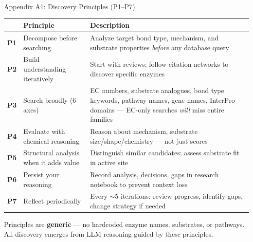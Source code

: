 \documentclass[aspectratio=169, 11pt]{beamer}
\begin{document}
\begin{frame}{Appendix A1: Discovery Principles (P1--P7)}
\vspace{-6pt}
{\scriptsize
\begin{tabular}{@{}c l p{9.5cm}@{}}
\toprule
 & \textbf{Principle} & \textbf{Description} \\
\midrule
\textbf{P1} & Decompose before searching & Analyze target bond type, mechanism, and substrate properties \textit{before} any database query \\
\textbf{P2} & Build understanding iteratively & Start with reviews; follow citation networks to discover specific enzymes \\
\textbf{P3} & Search broadly (6 axes) & EC numbers, substrate analogues, bond type keywords, pathway names, gene names, InterPro domains --- EC-only searches \textit{will} miss entire families \\
\textbf{P4} & Evaluate with chemical reasoning & Reason about mechanism, substrate size/shape/chemistry --- not just scores \\
\textbf{P5} & Structural analysis when it adds value & Distinguish similar candidates; assess substrate fit in active site \\
\textbf{P6} & Persist your reasoning & Record analysis, decisions, gaps in research notebook to prevent context loss \\
\textbf{P7} & Reflect periodically & Every $\sim$5 iterations: review progress, identify gaps, change strategy if needed \\
\bottomrule
\end{tabular}
}
\vspace{4pt}
\begin{center}
\colorbox{lightblue!50}{\parbox{0.88\textwidth}{\centering
\scriptsize Principles are \textbf{generic} --- no hardcoded enzyme names, substrates, or pathways. All discovery emerges from LLM reasoning guided by these principles.
}}
\end{center}
\end{frame}
\end{document}
